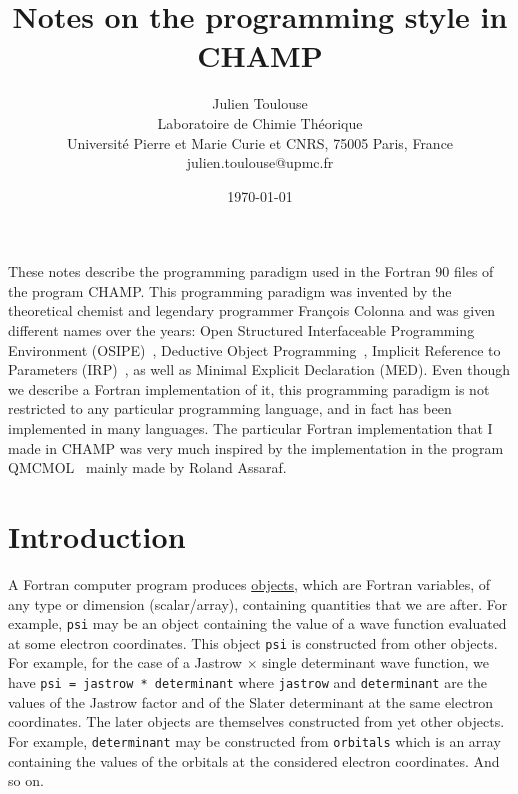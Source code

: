 \documentclass[a4paper,11pt]{article}
\newcommand\Def[1]{\underline{#1}}
\begin{document}
\title{Notes on the programming style in CHAMP}

\author{Julien Toulouse\\
Laboratoire de Chimie Th\'eorique\\Universit\'e Pierre et Marie Curie et CNRS, 75005 Paris, France\\
julien.toulouse@upmc.fr}

\date{\today}

\maketitle

\setcounter{secnumdepth}{5}
\setcounter{tocdepth}{5}
\tableofcontents
\vspace*{5em}

These notes describe the programming paradigm used in the Fortran 90 files of the program CHAMP. This programming paradigm was invented by the theoretical chemist and legendary programmer François Colonna and was given different names over the years:
Open Structured Interfaceable Programming Environment (OSIPE)~\cite{ColJolPoiAngJan-CPC-94},
Deductive Object Programming~\cite{Col-ARX-06},
Implicit Reference to Parameters (IRP)~\cite{Sce-ARX-09},
as well as Minimal Explicit Declaration (MED).
Even though we describe a Fortran implementation of it, this programming paradigm is not restricted to any particular programming language, and in fact has been implemented in many languages. The particular Fortran implementation that I made in CHAMP was very much inspired by the implementation in the program QMCMOL~\cite{Qmc-PROG-XX} mainly made by Roland Assaraf.

\section{Introduction}
A Fortran computer program produces \Def{objects}, which are Fortran variables, of any type or dimension (scalar/array), containing quantities that we are after. For example, {\tt psi} may be an object containing the value of a wave function evaluated at some electron coordinates. This object {\tt psi} is constructed from other objects. For example, for the case of a Jastrow $\times$ single determinant wave function, we have {\tt psi = jastrow * determinant} where {\tt jastrow} and {\tt determinant} are the values of the Jastrow factor and of the Slater determinant at the same electron coordinates. The later objects are themselves constructed from yet other objects. For example, {\tt determinant} may be constructed from {\tt orbitals} which is an array containing the values of the orbitals at the considered electron coordinates. And so on.
\end{document}
